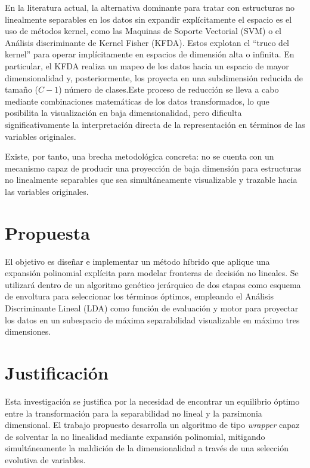 En la literatura actual, la alternativa dominante para tratar con estructuras no linealmente separables en los datos sin expandir explícitamente el espacio es el uso de métodos kernel, como las Maquinas de Soporte Vectorial (SVM) o el Análisis discriminante de Kernel Fisher (KFDA). Estos explotan el ``truco del kernel'' para operar implícitamente en espacios de dimensión alta o infinita. En particular, el KFDA realiza un mapeo de los datos hacia un espacio de mayor dimensionalidad y, posteriormente, los proyecta en una subdimensión reducida de tamaño  ($C - 1$) número de clases.Este proceso de reducción se lleva a cabo mediante combinaciones matemáticas de los datos transformados, lo que posibilita la visualización en baja dimensionalidad, pero dificulta significativamente la interpretación directa de la representación en términos de las variables originales. 

Existe, por tanto, una brecha metodológica concreta: no se cuenta con un mecanismo capaz de producir una proyección de baja dimensión para estructuras no linealmente separables que sea simultáneamente visualizable y trazable hacia las variables originales. 

\section{Propuesta}

El objetivo es diseñar e implementar un método híbrido que aplique una expansión polinomial explícita para modelar fronteras de decisión no lineales. Se utilizará dentro de un algoritmo genético jerárquico de dos etapas como esquema de envoltura para seleccionar los términos óptimos, empleando el Análisis Discriminante Lineal (LDA) como función de evaluación y motor para proyectar los datos en un subespacio de máxima separabilidad visualizable en máximo tres dimensiones.

\section{Justificación}
\label{sec:Justificacion}

Esta investigación se justifica por la necesidad de encontrar un equilibrio óptimo entre la transformación para la separabilidad no lineal y la parsimonia dimensional. El trabajo propuesto desarrolla un algoritmo de tipo \textit{wrapper} capaz de solventar la no linealidad mediante expansión polinomial, mitigando simultáneamente la maldición de la dimensionalidad a través de una selección evolutiva de variables.

